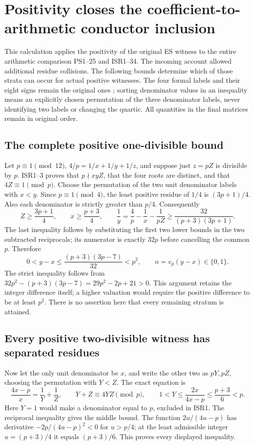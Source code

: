 \section{Positivity closes the coefficient-to-arithmetic conductor inclusion}
This calculation applies the positivity of the original ES witness to the
entire arithmetic comparison PS1--25 and ISR1--34. The incoming account
\cite[eqs.\ (9)--(23)]{DefiningPrimeReceived} allowed additional residue
collisions. The following bounds determine which of those strata can
occur for actual positive witnesses. The four formal labels and their
eight signs remain the original ones \cite{ES488}; sorting denominator
values in an inequality means an explicitly chosen permutation of the
three denominator labels, never identifying two labels or changing the
quartic. All quantities in the final matrices remain in original order.

\subsection{The complete positive one-divisible bound}
Let $p\equiv1\pmod{12}$, $4/p=1/x+1/y+1/z$, and suppose just $z=pZ$
is divisible by $p$. ISR1--3 proves that $p\nmid xyZ$, that the four
roots are distinct, and that $4Z\equiv1\pmod p$. Choose the permutation
of the two unit denominator labels with $x<y$. Since $p\equiv1\pmod4$,
the least positive residue of $1/4$ is $(3p+1)/4$. Also each denominator
is strictly greater than $p/4$. Consequently
\[
 Z\ge\frac{3p+1}{4},\qquad x\ge\frac{p+3}{4},\qquad
 \frac1y=\frac4p-\frac1x-\frac1{pZ}
 \ge\frac{32}{(p+3)(3p+1)}.
 \tag{PB1}
\]
The last inequality follows by substituting the first two lower bounds
in the two subtracted reciprocals; its numerator is exactly $32p$ before
cancelling the common $p$. Therefore
\[
 0<y-x\le\frac{(p+3)(3p-7)}{32}<p^2,
 \qquad n=v_p(y-x)\in\{0,1\}.
 \tag{PB2}
\]
The strict inequality follows from
$32p^2-(p+3)(3p-7)=29p^2-2p+21>0$.
This argument retains the integer difference itself; a higher valuation
would require the positive difference to be at least $p^2$.
There is no assertion here that every remaining stratum is attained.

\subsection{Every positive two-divisible witness has separated residues}
Now let the only unit denominator be $x$, and write the other two as
$pY,pZ$, choosing the permutation with $Y<Z$. The exact equation is
\[
 \frac{4x-p}{x}=\frac1Y+\frac1Z,\qquad
 Y+Z\equiv4YZ\pmod p,\qquad
 1<Y\le\frac{2x}{4x-p}\le\frac{p+3}{6}<p.
 \tag{PB3}
\]
Here $Y=1$ would make a denominator equal to $p$, excluded in ISR1.
The reciprocal inequality gives the middle bound. The function
$2u/(4u-p)$ has derivative $-2p/(4u-p)^2<0$ for $u>p/4$;
at the least admissible integer $u=(p+3)/4$ it equals $(p+3)/6$.
This proves every displayed inequality.

